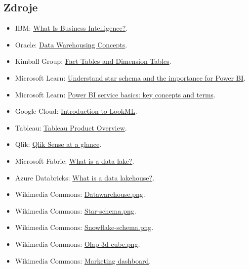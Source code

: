 \subsection{Zdroje}
\begin{itemize}
  \item IBM:
    \href{https://www.ibm.com/topics/business-intelligence}{What Is Business Intelligence?}.
  \item Oracle:
    \href{https://docs.oracle.com/cd/B13789_01/server.101/b10736/concept.htm}{Data Warehousing Concepts}.
  \item Kimball Group:
    \href{https://www.kimballgroup.com/2003/01/fact-tables-and-dimension-tables/}{Fact Tables and Dimension Tables}.
  \item Microsoft Learn:
    \href{https://learn.microsoft.com/en-us/power-bi/guidance/star-schema}{Understand star schema and the importance for Power BI}.
  \item Microsoft Learn:
    \href{https://learn.microsoft.com/en-us/power-bi/consumer/end-user-basic-concepts}{Power BI service basics: key concepts and terms}.
  \item Google Cloud:
    \href{https://docs.cloud.google.com/looker/docs/what-is-lookml}{Introduction to LookML}.
  \item Tableau:
    \href{https://help.tableau.com/current/tableau/en-us/tableau_product_overview.htm}{Tableau Product Overview}.
  \item Qlik:
    \href{https://help.qlik.com/en-US/sense/May2024/Subsystems/Hub/Content/Sense_Hub/Introduction/qlik-sense-product-family.htm}{Qlik Sense at a glance}.
  \item Microsoft Fabric:
    \href{https://www.microsoft.com/en-us/microsoft-fabric/resources/data-101/what-is-data-lake}{What is a data lake?}.
  \item Azure Databricks:
    \href{https://learn.microsoft.com/en-us/azure/databricks/lakehouse/}{What is a data lakehouse?}.
  \item Wikimedia Commons:
    \href{https://commons.wikimedia.org/wiki/File:Datawarehouse.png}{Datawarehouse.png}.
  \item Wikimedia Commons:
    \href{https://commons.wikimedia.org/wiki/File:Star-schema.png}{Star-schema.png}.
  \item Wikimedia Commons:
    \href{https://commons.wikimedia.org/wiki/File:Snowflake-schema.png}{Snowflake-schema.png}.
  \item Wikimedia Commons:
    \href{https://commons.wikimedia.org/wiki/File:Olap-3d-cube.png}{Olap-3d-cube.png}.
  \item Wikimedia Commons:
    \href{https://commons.wikimedia.org/wiki/File:Marketing\_dashboard.png}{Marketing dashboard}.
\end{itemize}

\newpage
